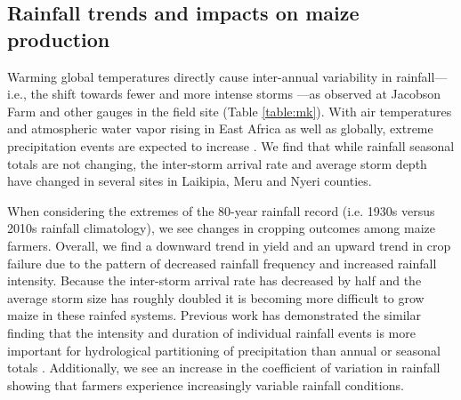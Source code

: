 \subsection{Rainfall trends and impacts on maize production}

Warming global temperatures directly cause inter-annual variability in rainfall---i.e., the shift towards fewer and more intense storms \cite{IPCC2007}---as observed at Jacobson Farm and other gauges in the field site (Table \ref{table:mk}). With air temperatures and atmospheric water vapor rising in East Africa as well as globally, extreme precipitation events are expected to increase \cite{trenberth2011changes,christiansen2007}. We find that while rainfall seasonal totals are not changing, the inter-storm arrival rate and average storm depth have changed in several sites in Laikipia, Meru and Nyeri counties.

When considering the extremes of the 80-year rainfall record (i.e. 1930s versus 2010s rainfall climatology), we see changes in cropping outcomes among maize farmers. Overall, we find a downward trend in yield and an upward trend in crop failure due to the pattern of decreased rainfall frequency and increased rainfall intensity. Because the inter-storm arrival rate has decreased by half and the average storm size has roughly doubled it is becoming more difficult to grow maize in these rainfed systems. Previous work has demonstrated the similar finding that the intensity and duration of individual rainfall events is more important for hydrological partitioning of precipitation than annual or seasonal totals \cite{taylor2013evidence,apurv2017understanding,singer2017deciphering,adloff-inreview}. Additionally, we see an increase in the coefficient of variation in rainfall showing that farmers experience increasingly variable rainfall conditions.

